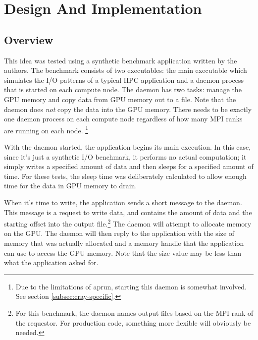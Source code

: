 \section{Design And Implementation}
\label{sec:design}


\subsection{Overview}
\label{subsec:overview}
This idea was tested using a synthetic benchmark application written by the authors.  The benchmark consists of two executables: the main executable which simulates the I/O patterns of a typical HPC application and a daemon process that is started on each compute node.  The daemon has two tasks: manage the GPU memory and copy data from GPU memory out to a file.  Note that the daemon does \emph{not} copy the data into the GPU memory.  There needs to be exactly one daemon process on each compute node regardless of how many MPI ranks are running on each node.  \footnote{Due to the limitations of aprun, starting this daemon is somewhat involved.  See section \ref{subsec:cray-specific}.}

With the daemon  started, the application begins its main execution.  In this case, since it's just a synthetic 
I/O benchmark, it performs no actual computation; it simply writes a specified amount of data and then sleeps for a specified amount of time.  For these tests, the sleep time was deliberately calculated to allow enough time for the data in GPU memory to drain.

When it's time to write, the application sends a short message to the daemon.  This message is a request to write data, and contains the amount of data and the starting offset into the output file.\footnote{For this benchmark, the daemon names output files based on the MPI rank of the requestor.  For production code, something more flexible will obviously be needed.}
  The daemon will attempt to allocate memory on the GPU.  The daemon will then reply to the application with the size of memory that was actually allocated and a memory handle that the application can use to access the GPU memory.  Note that the size value may be less than what the application asked for.

